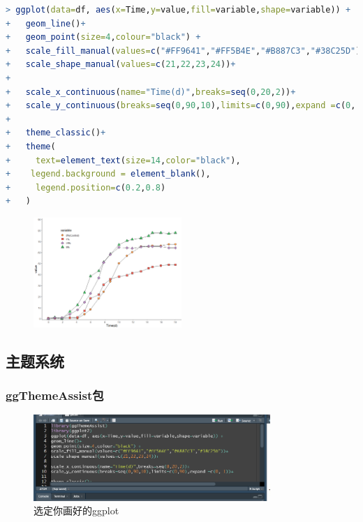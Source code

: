 \documentclass[11pt,a4paper,oneside]{book}
\begin{document}
\begin{lstlisting}[language=r]
> ggplot(data=df, aes(x=Time,y=value,fill=variable,shape=variable)) + 
+   geom_line()+
+   geom_point(size=4,colour="black") +
+   scale_fill_manual(values=c("#FF9641","#FF5B4E","#B887C3","#38C25D"))+
+   scale_shape_manual(values=c(21,22,23,24))+
+   
+   scale_x_continuous(name="Time(d)",breaks=seq(0,20,2))+
+   scale_y_continuous(breaks=seq(0,90,10),limits=c(0,90),expand =c(0, 1))+
+   
+   theme_classic()+
+   theme(
+     text=element_text(size=14,color="black"),
+    legend.background = element_blank(),
+     legend.position=c(0.2,0.8)
+   )
\end{lstlisting}
\begin{figure}[H]
	\centering
	\includegraphics[width=0.5\textwidth]{screenshot009}
\end{figure}
\subsection{主题系统}
\subsubsection{ggThemeAssist包}
\begin{figure}[H]
	\centering
	\includegraphics[width=0.8\textwidth]{screenshot012}
	\caption{选定你画好的ggplot}
	\label{fig:screenshot012}
\end{figure}
\end{document}
